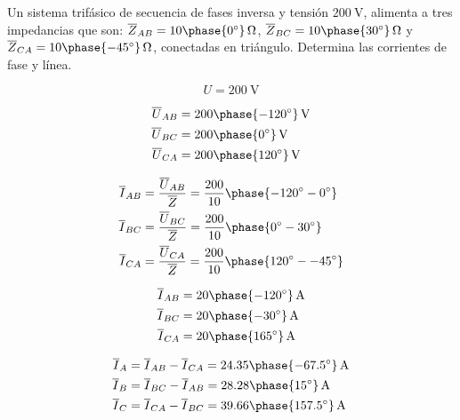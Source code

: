 \documentclass[12pt]{article}
\begin{document}
 Un sistema trifásico de secuencia de fases inversa y tensión
 $\SI{200}{\volt}$, alimenta a tres impedancias que son:
 $\overline{Z}_{AB} =
 \SI[parse-numbers=false]{10\phase{\ang{0}}}{\ohm}$,
 $\overline{Z}_{BC} =
 \SI[parse-numbers=false]{10\phase{\ang{30}}}{\ohm}$ y
 $\overline{Z}_{CA} =
 \SI[parse-numbers=false]{10\phase{\ang{-45}}}{\ohm}$, conectadas en
 triángulo. Determina las corrientes de fase y línea.

 \noindent\hrulefill
 
\[
  U = \SI[parse-numbers=false]{200}{\volt}
\]
  
  \begin{align*}
    \overline{U}_{AB} &= \SI[parse-numbers=false]{200\phase{\ang{-120}}}{\volt}\\
    \overline{U}_{BC} &= \SI[parse-numbers=false]{200\phase{\ang{0}}}{\volt}\\
    \overline{U}_{CA} &= \SI[parse-numbers=false]{200\phase{\ang{120}}}{\volt}\\
  \end{align*}

 \begin{align*}
   \overline{I}_{AB} &= \frac{\overline{U}_{AB}}{\overline{Z}} = \frac{200}{10}\phase{\ang{-120} - \ang{0}} \\
   \overline{I}_{BC} &= \frac{\overline{U}_{BC}}{\overline{Z}} = \frac{200}{10}\phase{\ang{0} - \ang{30}}\\
   \overline{I}_{CA} &= \frac{\overline{U}_{CA}}{\overline{Z}} = \frac{200}{10}\phase{\ang{120} - \ang{-45}}
 \end{align*}

  \begin{align*}
    \overline{I}_{AB} &= \SI[parse-numbers=false]{20\phase{\ang{-120}}}{\ampere}\\
    \overline{I}_{BC} &= \SI[parse-numbers=false]{20\phase{\ang{-30}}}{\ampere}\\
    \overline{I}_{CA} &= \SI[parse-numbers=false]{20\phase{\ang{165}}}{\ampere}
  \end{align*}

 \begin{align*}
   \overline{I}_A &= \overline{I}_{AB} - \overline{I}_{CA} = \SI[parse-numbers=false]{24.35\phase{\ang{-67.5}}}{\ampere}\\
   \overline{I}_B &= \overline{I}_{BC} - \overline{I}_{AB} = \SI[parse-numbers=false]{28.28\phase{\ang{15}}}{\ampere}\\
   \overline{I}_C &= \overline{I}_{CA} - \overline{I}_{BC} = \SI[parse-numbers=false]{39.66\phase{\ang{157.5}}}{\ampere}\\
 \end{align*}
\end{document}
